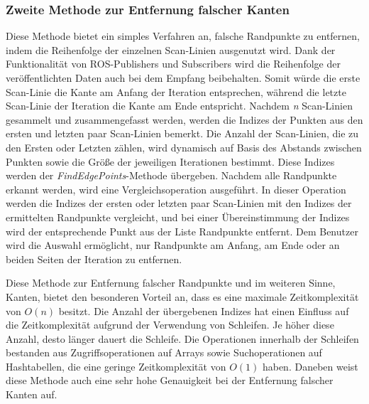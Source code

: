 \subsubsection{Zweite Methode zur Entfernung falscher Kanten}
Diese Methode bietet ein simples Verfahren an, falsche Randpunkte zu entfernen, indem die Reihenfolge der einzelnen Scan-Linien ausgenutzt wird. Dank der Funktionalität von ROS-Publishers und Subscribers wird die Reihenfolge der veröffentlichten Daten auch bei dem Empfang beibehalten. Somit würde die erste Scan-Linie die Kante am Anfang der Iteration entsprechen, während die letzte Scan-Linie der Iteration die Kante am Ende entspricht. Nachdem \textit{n} Scan-Linien gesammelt und zusammengefasst werden, werden die Indizes der Punkten aus den ersten und letzten paar Scan-Linien bemerkt. Die Anzahl der Scan-Linien, die zu den Ersten oder Letzten zählen, wird dynamisch auf Basis des Abstands zwischen Punkten sowie die Größe der jeweiligen Iterationen bestimmt. Diese Indizes werden der \textit{FindEdgePoints}-Methode übergeben. Nachdem alle Randpunkte erkannt werden, wird eine Vergleichsoperation ausgeführt. In dieser Operation werden die Indizes der ersten oder letzten paar Scan-Linien mit den Indizes der ermittelten Randpunkte vergleicht, und bei einer Übereinstimmung der Indizes wird der entsprechende Punkt aus der Liste Randpunkte entfernt. Dem Benutzer wird die Auswahl ermöglicht, nur Randpunkte am Anfang, am Ende oder an beiden Seiten der Iteration zu entfernen.

Diese Methode zur Entfernung falscher Randpunkte und im weiteren Sinne, Kanten, bietet den besonderen Vorteil an, dass es eine maximale Zeitkomplexität von $O(n)$ besitzt. Die Anzahl der übergebenen Indizes hat einen Einfluss auf die Zeitkomplexität aufgrund der Verwendung von Schleifen. Je höher diese Anzahl, desto länger dauert die Schleife. Die Operationen innerhalb der Schleifen bestanden aus Zugriffsoperationen auf Arrays sowie Suchoperationen auf Hashtabellen, die eine geringe Zeitkomplexität von $O(1)$ haben. Daneben weist diese Methode auch eine sehr hohe Genauigkeit bei der Entfernung falscher Kanten auf.


